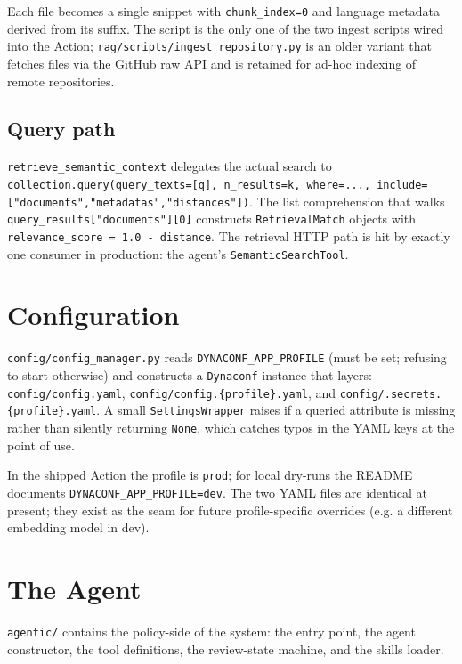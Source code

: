 \documentclass[11pt,a4paper]{article}
\newcommand{\code}[1]{\texttt{\small #1}}
\begin{document}
Each file becomes a single snippet with \code{chunk\_index=0} and language
metadata derived from its suffix. The script is the only one of the two
ingest scripts wired into the Action;
\code{rag/scripts/ingest\_repository.py} is an older variant that fetches
files via the GitHub raw API and is retained for ad-hoc indexing of remote
repositories.

\subsection{Query path}

\code{retrieve\_semantic\_context} delegates the actual search to
\code{collection.query(query\_texts=[q], n\_results=k, where=...,
include=["documents","metadatas","distances"])}. The list comprehension
that walks
\code{query\_results["documents"][0]} constructs \code{RetrievalMatch}
objects with
\code{relevance\_score = 1.0 - distance}. The retrieval HTTP path is hit
by exactly one consumer in production: the agent's
\code{SemanticSearchTool}.

\section{Configuration}

\code{config/config\_manager.py} reads \code{DYNACONF\_APP\_PROFILE} (must
be set; refusing to start otherwise) and constructs a
\code{Dynaconf} instance that layers:
\code{config/config.yaml}, \code{config/config.\{profile\}.yaml}, and
\code{config/.secrets.\{profile\}.yaml}. A small \code{SettingsWrapper}
raises if a queried attribute is missing rather than silently returning
\code{None}, which catches typos in the YAML keys at the point of use.

In the shipped Action the profile is \code{prod}; for local dry-runs the
README documents \code{DYNACONF\_APP\_PROFILE=dev}. The two YAML files are
identical at present; they exist as the seam for future
profile-specific overrides (e.g. a different embedding model in dev).

\section{The Agent}
\label{sec:agent}

\code{agentic/} contains the policy-side of the system: the entry point,
the agent constructor, the tool definitions, the review-state machine, and
the skills loader.
\end{document}
